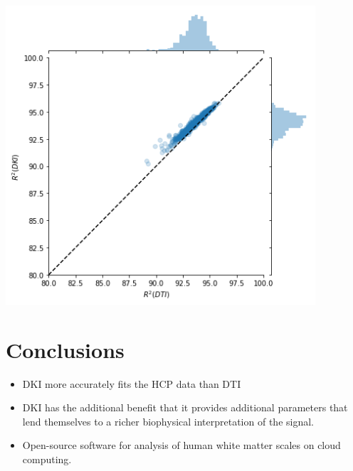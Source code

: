 \documentclass[a0, landscape]{a0poster}
\begin{document}
\begin{multicols}{3}
\begin{minipage}[b]{1\linewidth}
\begin{minipage}[b]{0.33\linewidth}
  \includegraphics[width=11.5cm]{dti_1000_dki.png}
  \end{minipage}
\end{minipage}


\color{SaddleBrown} %

\section*{Conclusions}
\large
\begin{itemize}

\item DKI more accurately fits the HCP data than DTI

\item DKI has the additional benefit that it provides additional parameters that
lend themselves to a richer biophysical interpretation of the signal.

\item Open-source software for analysis of human white matter scales on cloud computing.
\end{itemize}

\color{DarkSlateGray} %



\end{multicols}
\end{document}

